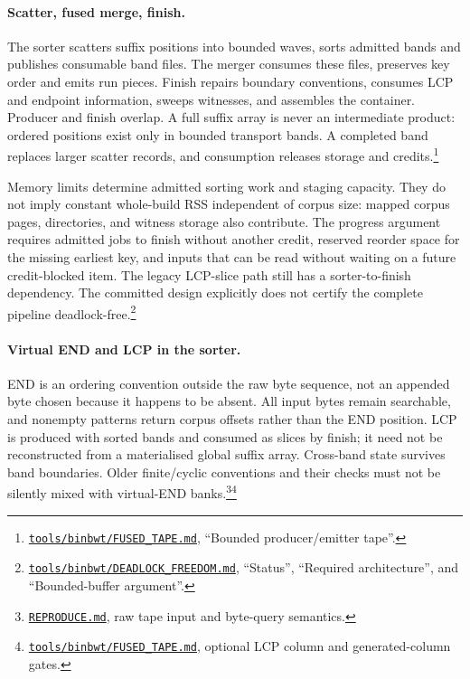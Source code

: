 \documentclass[10pt]{article}
\newcommand{\ev}[2]{\footnote{\href{https://github.com/pangenome/sxgc/blob/c46a85217b9b269c91179cbebc396f96453181af/#1}{\nolinkurl{#1}}, #2.}}
\begin{document}
\paragraph{Scatter, fused merge, finish.}
The sorter scatters suffix positions into bounded waves, sorts admitted bands and publishes
consumable band files. The merger consumes these files, preserves key order and emits run pieces.
Finish repairs boundary conventions, consumes LCP and endpoint information, sweeps witnesses, and
assembles the container. Producer and finish overlap. A full suffix array is never an intermediate
product: ordered positions exist only in bounded transport bands. A completed band replaces larger
scatter records, and consumption releases storage and
credits.\ev{tools/binbwt/FUSED_TAPE.md}{``Bounded producer/emitter tape''}

Memory limits determine admitted sorting work and staging capacity. They do not imply constant
whole-build RSS independent of corpus size: mapped corpus pages, directories, and witness storage
also contribute. The progress argument requires admitted jobs to finish without another credit,
reserved reorder space for the missing earliest key, and inputs that can be read without waiting on
a future credit-blocked item. The legacy LCP-slice path still has a sorter-to-finish dependency. The
committed design explicitly does not certify the complete pipeline
deadlock-free.\ev{tools/binbwt/DEADLOCK_FREEDOM.md}{``Status'', ``Required architecture'', and
``Bounded-buffer argument''}

\paragraph{Virtual END and LCP in the sorter.}
END is an ordering convention outside the raw byte sequence, not an appended byte chosen because it
happens to be absent. All input bytes remain searchable, and nonempty patterns return corpus offsets
rather than the END position. LCP is produced with sorted bands and consumed as slices by finish; it
need not be reconstructed from a materialised global suffix array. Cross-band state survives band
boundaries. Older finite/cyclic conventions and their checks must not be silently mixed with
virtual-END banks.\ev{REPRODUCE.md}{raw tape input and byte-query
semantics}\ev{tools/binbwt/FUSED_TAPE.md}{optional LCP column and generated-column gates}
\end{document}
